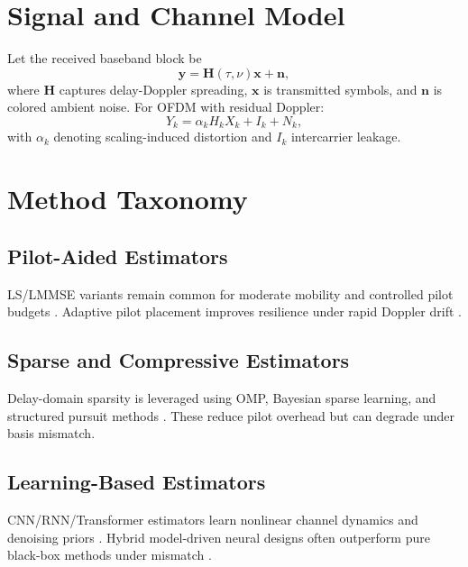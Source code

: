 \documentclass[10pt,journal]{IEEEtran}
\begin{document}
\section{Signal and Channel Model}
Let the received baseband block be
\begin{equation}
\mathbf{y} = \mathbf{H}(\tau,\nu)\mathbf{x} + \mathbf{n},
\end{equation}
where $\mathbf{H}$ captures delay-Doppler spreading, $\mathbf{x}$ is transmitted symbols, and $\mathbf{n}$ is colored ambient noise. For OFDM with residual Doppler:
\begin{equation}
Y_k = \alpha_k H_k X_k + I_k + N_k,
\end{equation}
with $\alpha_k$ denoting scaling-induced distortion and $I_k$ intercarrier leakage.

\section{Method Taxonomy}
\subsection{Pilot-Aided Estimators}
LS/LMMSE variants remain common for moderate mobility and controlled pilot budgets \cite{ref1,ref2,ref3,ref4,ref5,ref6,ref7,ref8,ref9,ref10,ref11,ref12,ref13,ref14,ref15,ref16,ref17,ref18,ref19,ref20,ref21,ref22,ref23,ref24}. Adaptive pilot placement improves resilience under rapid Doppler drift \cite{ref25,ref26,ref27,ref28,ref29,ref30,ref31,ref32,ref33,ref34,ref35,ref36,ref37,ref38,ref39,ref40,ref41,ref42,ref43,ref44,ref45,ref46,ref47,ref48}.

\subsection{Sparse and Compressive Estimators}
Delay-domain sparsity is leveraged using OMP, Bayesian sparse learning, and structured pursuit methods \cite{ref25,ref26,ref27,ref28,ref29,ref30,ref31,ref32,ref33,ref34,ref35,ref36,ref37,ref38,ref39,ref40,ref41,ref42,ref43,ref44,ref45,ref46,ref47,ref48}. These reduce pilot overhead but can degrade under basis mismatch.

\subsection{Learning-Based Estimators}
CNN/RNN/Transformer estimators learn nonlinear channel dynamics and denoising priors \cite{ref49,ref50,ref51,ref52,ref53,ref54,ref55,ref56,ref57,ref58,ref59,ref60,ref61,ref62,ref63,ref64,ref65,ref66,ref67,ref68,ref69,ref70,ref71,ref72}. Hybrid model-driven neural designs often outperform pure black-box methods under mismatch \cite{ref73,ref74,ref75,ref76,ref77,ref78,ref79,ref80,ref81,ref82,ref83,ref84,ref85,ref86,ref87,ref88,ref89,ref90,ref91,ref92,ref93,ref94,ref95,ref96}.
\end{document}
